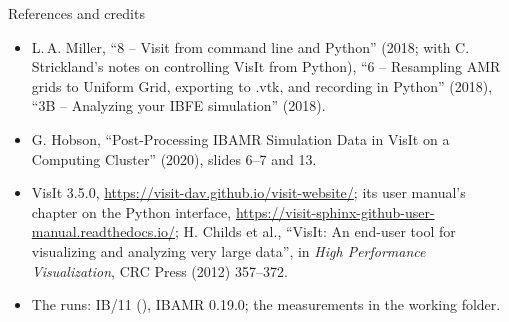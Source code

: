 \documentclass[aspectratio=169,11pt]{beamer}
\begin{document}
\begin{frame}{References and credits}
\label{fr:refs}
\scriptsize
\begin{itemize}
  \item L.\,A. Miller, ``8 -- Visit from command line and Python'' (2018; with C. Strickland's notes on controlling VisIt from Python), ``6 -- Resampling AMR grids to Uniform Grid, exporting to .vtk, and recording in Python'' (2018), ``3B -- Analyzing your IBFE simulation'' (2018).
  \item G. Hobson, ``Post-Processing IBAMR Simulation Data in VisIt on a Computing Cluster'' (2020), slides 6--7 and 13.
  \item VisIt 3.5.0, \url{https://visit-dav.github.io/visit-website/}; its user manual's chapter on the Python interface, \url{https://visit-sphinx-github-user-manual.readthedocs.io/}; H. Childs et al., ``VisIt: An end-user tool for visualizing and analyzing very large data'', in \emph{High Performance Visualization}, CRC Press (2012) 357--372.
  \item The runs: IB/11 (), IBAMR 0.19.0; the measurements  in the working folder.
\end{itemize}
\end{frame}
\end{document}
